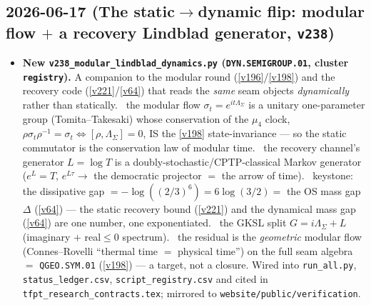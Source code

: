 \subsection*{2026-06-17 (The static$\to$dynamic flip: modular flow $+$ a recovery Lindblad generator, \texttt{v238})}
\begin{itemize}
\item \textbf{New \texttt{v238\_modular\_lindblad\_dynamics.py} (\texttt{DYN.SEMIGROUP.01}, cluster
  \texttt{registry}).} A companion to the modular round (\vref{v196}/\vref{v198}) and the recovery code
  (\vref{v221}/\vref{v64}) that reads the \emph{same} seam objects \emph{dynamically} rather than
  statically. \mE\ the modular flow $\sigma_t=e^{i t\Lambda_\Sigma}$ is a unitary one-parameter group
  (Tomita--Takesaki) whose conservation of the $\mu_4$ clock,
  $\rho\sigma_t\rho^{-1}=\sigma_t\Leftrightarrow[\rho,\Lambda_\Sigma]=0$, IS the \vref{v198}
  state-invariance --- so the static commutator is the conservation law of modular time. \mE\ the
  recovery channel's generator $L=\log T$ is a doubly-stochastic/CPTP-classical Markov generator
  ($e^{L}=T$, $e^{L\tau}\to$ the democratic projector $=$ the arrow of time). \mE\ keystone: the
  dissipative gap $=-\log((2/3)^6)=6\log(3/2)=$ the OS mass gap $\Delta$ (\vref{v64}) --- the static
  recovery bound (\vref{v221}) and the dynamical mass gap (\vref{v64}) are one number, one
  exponentiated. \mE\ the GKSL split $G=i\Lambda_\Sigma+L$ (imaginary $+$ real$\le0$ spectrum). \mO\
  the residual is the \emph{geometric} modular flow (Connes--Rovelli ``thermal time $=$ physical
  time'') on the full seam algebra $=$ \texttt{QGEO.SYM.01} (\vref{v198}) --- a target, not a closure.
  Wired into \texttt{run\_all.py}, \texttt{status\_ledger.csv}, \texttt{script\_registry.csv} and cited
  in \texttt{tfpt\_research\_contracts.tex}; mirrored to \texttt{website/public/verification}.
\end{itemize}

